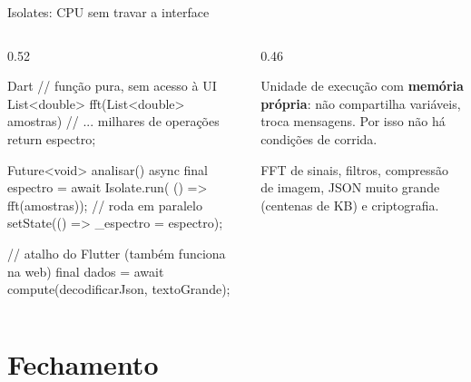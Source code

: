 \documentclass[aspectratio=169,10pt]{beamer}
\begin{document}
\begin{frame}[fragile]{Isolates: CPU sem travar a interface}
  \begin{columns}[T]
    \begin{column}{0.52\textwidth}
\begin{codigo}[title=Cálculo pesado em outro isolate]{Dart}
// função pura, sem acesso à UI
List<double> fft(List<double> amostras) {
  // ... milhares de operações
  return espectro;
}

Future<void> analisar() async {
  final espectro = await Isolate.run(
      () => fft(amostras));     // roda em paralelo
  setState(() => _espectro = espectro);
}

// atalho do Flutter (também funciona na web)
final dados = await compute(decodificarJson, textoGrande);
\end{codigo}
    \end{column}
    \begin{column}{0.46\textwidth}
      \centering
      \begin{conceito}[Isolate]
        Unidade de execução com \textbf{memória própria}: não compartilha variáveis, troca mensagens. Por isso não há condições de corrida.
      \end{conceito}
      \begin{dica}
        FFT de sinais, filtros, compressão de imagem, JSON muito grande (centenas de KB) e criptografia.
      \end{dica}
    \end{column}
  \end{columns}
\end{frame}

\section{Fechamento}
\end{document}
